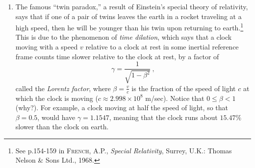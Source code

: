 {\begin{enumerate}[item-label={\bfseries \arabic*.}]
[item-label={{[\bfseries \arabic*.]}}]
 \item The famous ``twin paradox,'' a result of Einstein's special theory of
 relativity, says that if one of a pair of twins leaves the earth in a rocket
 traveling at a high speed, then he will be younger than his twin upon
 returning to earth.\footnote{See p.154-159 in \textsc{French, A.P.},
 \emph{Special Relativity}, Surrey, U.K.: Thomas Nelson \& Sons Ltd., 1968.}
 This is due to the phenomenon of \emph{time dilation}, which says that a clock
 moving with a speed $v$ relative to a clock at rest in some inertial reference
 frame counts time slower relative to the clock at rest, by a factor
 of
 \begin{displaymath}
  \gamma = \dfrac{1}{\sqrt{1 - \beta^2}} ~,
 \end{displaymath}
 called the \emph{Lorentz factor}, where
 $\beta = \frac{v}{c}$ is the fraction of the speed of light $c$ at which the
 clock is moving ($c \approx 2.998 \times 10^8$ m/sec). Notice that
 $0 \le \beta < 1$ (why?). For example, a clock moving at half the speed of
 light, so that $\beta = 0.5$, would have $\gamma = 1.1547$, meaning that the
 clock runs about $15.47\%$ slower than the clock on earth.

\end{enumerate}}
